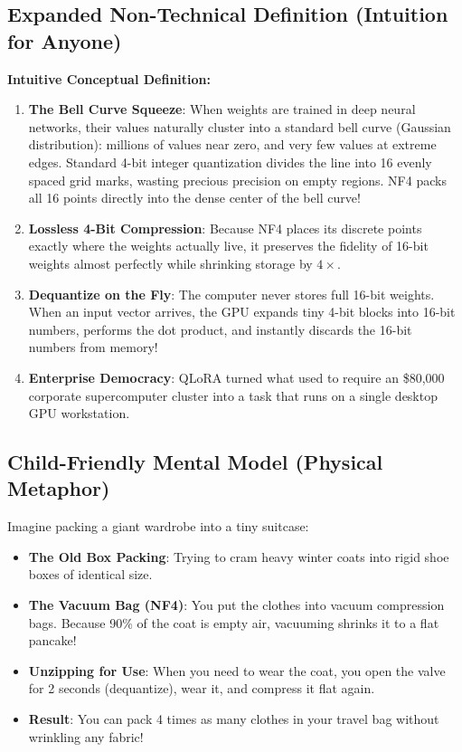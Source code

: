 \documentclass[11pt,a4paper]{article}
\theoremstyle{definition}
\begin{document}
\subsection{Expanded Non-Technical Definition (Intuition for Anyone)}
\textbf{Intuitive Conceptual Definition:}
\begin{enumerate}
    \item \textbf{The Bell Curve Squeeze}: When weights are trained in deep neural networks, their values naturally cluster into a standard bell curve (Gaussian distribution): millions of values near zero, and very few values at extreme edges. Standard 4-bit integer quantization divides the line into 16 evenly spaced grid marks, wasting precious precision on empty regions. NF4 packs all 16 points directly into the dense center of the bell curve!
    \item \textbf{Lossless 4-Bit Compression}: Because NF4 places its discrete points exactly where the weights actually live, it preserves the fidelity of 16-bit weights almost perfectly while shrinking storage by $4\times$.
    \item \textbf{Dequantize on the Fly}: The computer never stores full 16-bit weights. When an input vector arrives, the GPU expands tiny 4-bit blocks into 16-bit numbers, performs the dot product, and instantly discards the 16-bit numbers from memory!
    \item \textbf{Enterprise Democracy}: QLoRA turned what used to require an \$80,000 corporate supercomputer cluster into a task that runs on a single desktop GPU workstation.
\end{enumerate}

\subsection{Child-Friendly Mental Model (Physical Metaphor)}
Imagine packing a giant wardrobe into a tiny suitcase:
\begin{itemize}
    \item \textbf{The Old Box Packing}: Trying to cram heavy winter coats into rigid shoe boxes of identical size.
    \item \textbf{The Vacuum Bag (NF4)}: You put the clothes into vacuum compression bags. Because 90\% of the coat is empty air, vacuuming shrinks it to a flat pancake!
    \item \textbf{Unzipping for Use}: When you need to wear the coat, you open the valve for 2 seconds (dequantize), wear it, and compress it flat again.
    \item \textbf{Result}: You can pack 4 times as many clothes in your travel bag without wrinkling any fabric!
\end{itemize}
\end{document}
